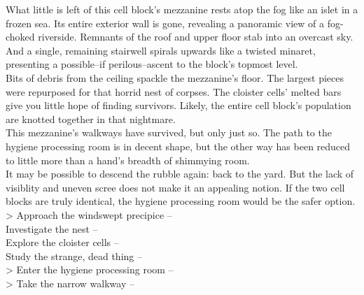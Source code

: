 What little is left of this cell block’s mezzanine rests atop the fog like an islet in a frozen sea. Its entire exterior wall is gone, revealing a panoramic view of a fog-choked riverside. Remnants of the roof and upper floor stab into an overcast sky. And a single, remaining stairwell spirals upwards like a twisted minaret, presenting a possible--if perilous--ascent to the block’s topmost level.\\

Bits of debris from the ceiling spackle the mezzanine's floor. The largest pieces were repurposed for that horrid nest of corpses. The cloister cells’ melted bars give you little hope of finding survivors. Likely, the entire cell block's population are knotted together in that nightmare.\\

This mezzanine's walkways have survived, but only just so. The path to the hygiene processing room is in decent shape, but the other way has been reduced to little more than a hand's breadth of shimmying room.\\

It may be possible to descend the rubble again: back to the yard. But the lack of visiblity and uneven scree does not make it an appealing notion. If the two cell blocks are truly identical, the hygiene processing room would be the safer option.\\

> Approach the windswept precipice -- \\
 Investigate the nest -- \\
 Explore the cloister cells -- \\
 Study the strange, dead thing -- \\
> Enter the hygiene processing room -- \\
> Take the narrow walkway -- 